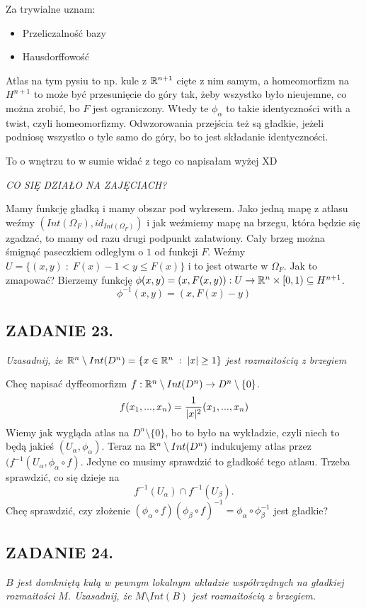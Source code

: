 \documentclass{article}
\begin{document}
Za trywialne uznam:
\begin{itemize}
    \item Przeliczalność bazy
    \item Hausdorffowość
\end{itemize}
Atlas na tym pysiu to np. kule z $\mathbb{R}^{n+1}$ cięte z nim samym, a homeomorfizm na $H^{n+1}$ to może być przesunięcie do góry tak, żeby wszystko było nieujemne, co można zrobić, bo $F$ jest ograniczony. Wtedy te $\phi_{\alpha}$ to takie identyczności with a twist, czyli homeomorfizmy. Odwzorowania przejścia też są gładkie, jeżeli podniosę wszystko o tyle samo do góry, bo to jest składanie identyczności.

To o wnętrzu to w sumie widać z tego co napisałam wyżej XD

\emph{CO SIĘ DZIAŁO NA ZAJĘCIACH?}

Mamy funkcję gładką i mamy obszar pod wykresem. Jako jedną mapę z atlasu weźmy
$(Int(\Omega_F),id_{Int(\Omega_F)})$ i jak weźmiemy mapę na brzegu, która będzie się
zgadzać, to mamy od razu drugi podpunkt załatwiony. Cały brzeg można śmignąć paseczkiem
odległym o $1$ od funkcji $F$. Weźmy $U=\{(x,y)\;:\;F(x)-1<y\leq F(x)\}$ i to jest otwarte
w $\Omega_F$. Jak to zmapować? Bierzemy funkcję
$\phi(x,y)=(x,F(x,y)):U\to\mathbb{R}^n\times[0,1)\subseteq H^{n+1}$.
$$\phi^{-1}(x,y)=(x,F(x)-y)$$


\subsection*{ZADANIE 23.}
\emph{\color{pink}Uzasadnij, że $\mathbb{R}^n\setminus Int(D^n)=\{x\in\mathbb{R}^n\;:\;|x|\geq1\}$ jest
rozmaitością z brzegiem}

Chcę napisać dyffeomorfizm $f:\mathbb{R}^n\setminus Int(D^n)\to D^n\setminus\{0\}$.
$$f(x_1,...,x_n)={1\over|x|^2}(x_1,...,x_n)$$
Wiemy jak wygląda atlas na $D^n\setminus\{0\}$, bo to było na wykładzie, czyli niech to
będą jakieś $(U_\alpha,\phi_\alpha)$. Teraz na $\mathbb{R}^n\setminus Int(D^n)$ indukujemy atlas
przez $(f^{-1}(U_\alpha,\phi_\alpha\circ f)$. Jedyne co musimy sprawdzić to gładkość tego
atlasu. Trzeba sprawdzić, co się dzieje na
$$f^{-1}(U_\alpha)\cap f^{-1}(U_\beta).$$
Chcę sprawdzić, czy złożenie $(\phi_\alpha\circ f)(\phi_\beta\circ
f)^{-1}=\phi_\alpha\circ\phi_\beta^{-1}$ jest gładkie?

\subsection*{ZADANIE 24.}
\emph{\color{yellow}$B$ jest domkniętą kulą w pewnym lokalnym układzie współrzędnych na
gładkiej rozmaitości $M$. Uzasadnij, że $M\setminus Int(B)$ jest rozmaitością z brzegiem.}
\end{document}
